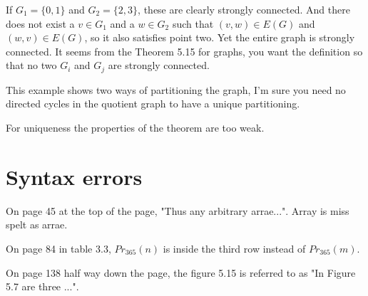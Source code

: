 \documentclass{article}
\begin{document}
If \(G_1=\{0,1\}\) and \(G_2=\{2,3\}\), these are clearly strongly connected. And there does not exist a \(v\in G_1\) and a \(w \in G_2\) such that \((v,w) \in E(G)\) and \((w,v) \in E(G)\), so it also satisfies point two. Yet the entire graph is strongly connected. It seems from the Theorem 5.15 for graphs, you want the definition so that no two \(G_i\) and \(G_j\) are strongly connected. 

This example shows two ways of partitioning the graph, I'm sure you need no directed cycles in the quotient graph to have a unique partitioning.

For uniqueness the properties of the theorem are too weak.



\section{Syntax errors}

On page 45 at the top of the page, "Thus any arbitrary arrae...". Array is miss spelt as arrae.

On page 84 in table 3.3, \(Pr_{365}(n)\) is inside the third row instead of \(Pr_{365}(m)\).

On page 138 half way down the page, the figure 5.15 is referred to as "In Figure 5.7 are three ...".
\end{document}
